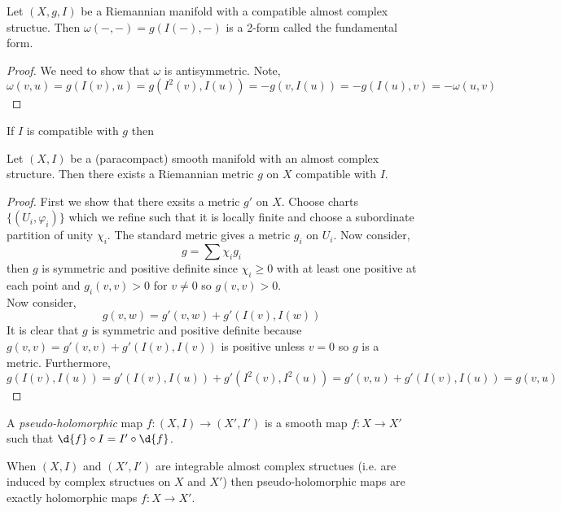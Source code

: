 \documentclass[12pt]{article}
\begin{document}
\begin{prop}
Let $(X, g, I)$ be a Riemannian manifold with a compatible almost complex structue. Then $\omega(-,-) = g(I(-), -)$ is a 2-form called the fundamental form.
\end{prop}

\begin{proof}
We need to show that $\omega$ is antisymmetric. Note,
\[ \omega(v, u) = g(I(v), u) = g(I^2(v), I(u)) = - g(v, I(u)) = - g(I(u), v) = - \omega(u, v) \]
\end{proof}

\begin{prop}
If $I$ is compatible with $g$ then 
\end{prop}

\begin{prop}
Let $(X, I)$ be a (paracompact) smooth manifold with an almost complex structure. Then there exists a Riemannian metric $g$ on $X$ compatible with $I$.
\end{prop}

\begin{proof}
First we show that there exsits a metric $g'$ on $X$. Choose charts $\{(U_i, \varphi_i)\}$ which we refine such that it is locally finite and choose a subordinate partition of unity $\chi_i$. The standard metric gives a metric $g_i$ on $U_i$. Now consider,
\[ g = \sum \chi_i g_i \]
then $g$ is symmetric and positive definite since $\chi_i \ge 0$ with at least one positive at each point and $g_i(v, v) > 0$ for $v \neq 0$ so $g(v, v) > 0$. 
\bigskip\\
Now consider,
\[ g(v, w) = g'(v, w) + g'(I(v), I(w)) \]
It is clear that $g$ is symmetric and positive definite because $g(v, v) = g'(v, v) + g'(I(v), I(v))$ is positive unless $v = 0$ so $g$ is a metric. Furthermore,
\[ g(I(v), I(u)) = g'(I(v), I(u)) + g'(I^2(v), I^2(u)) = g'(v, u) + g'(I(v), I(u)) = g(v, u) \]
\end{proof}

\begin{defn}
A \textit{pseudo-holomorphic} map $f : (X, I) \to (X', I')$ is a smooth map $f : X \to X'$ such that $\d{f} \circ I = I' \circ \d{f}$. 
\end{defn}

\begin{rmk}
When $(X, I)$ and $(X', I')$ are integrable almost complex structues (i.e. are induced by complex structues on $X$ and $X'$) then pseudo-holomorphic maps are exactly holomorphic maps $f : X \to X'$.
\end{rmk}
\end{document}
